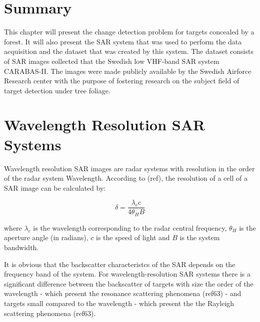 \section{Summary}
This chapter will present the change detection problem for targets concealed by a forest. It will 
also present the SAR system that was used to perform the data acquisition and the dataset that was created by this system.
The dataset consists of SAR images collected that the Swedish low VHF-band SAR system CARABAS-II. 
The images were made publicly available by the Swedish Airforce Research center with the purpose of fostering research on the 
subject field of target detection under tree foliage. 


\section{Wavelength Resolution SAR Systems}
Wavelength resolution SAR images are radar systems with resolution in the order of 
the radar system Wavelength. According to (ref), the resolution of a cell of a SAR image can be
calculated by:

\begin{equation}
    \delta = \frac{\lambda_c c}{4 \theta_H B}
\end{equation}

where $\lambda_c$ is the wavelength corresponding to the radar central frequency, $\theta_H$
is the aperture angle (in radians), $c$ is the speed of light and $B$ is the system bandwidth.

It is obvious that the backscatter characteristcs of the SAR depends on the frequency band of the system.
For wavelength-resolution SAR systems there is a significant difference between the backscatter of targets with size the order
of the wavelength - which present the resonance scattering phenomena (ref63) - and targets small compared to the wavelength - which present
the the Rayleigh scattering phenomena (ref63). 

